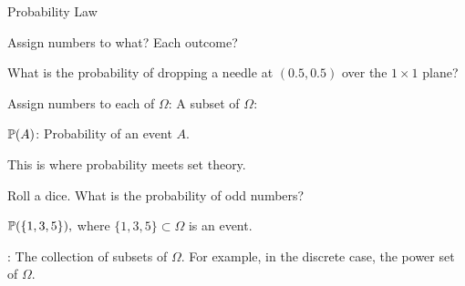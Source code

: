 \documentclass[handout,fleqn,aspectratio=169]{beamer}
\begin{document}
\begin{frame}{Probability Law}

\plitemsep 0.1in

\bci

\item Assign numbers to what? Each outcome?

\item What is the probability of dropping a needle at $(0.5, 0.5)$ over the $1\times 1$ plane? 

\item Assign numbers to each  of $\Omega$: A subset of $\Omega$: 

\item $\mathbb{P}( A )$: Probability of an event $A.$

\bci
\item This is where probability meets set theory.  

\item Roll a dice. What is the probability of odd numbers?

\medskip
$
\mathbb{P}(  \{1,3,5 \} ),
$
where $\{1,3,5 \} \subset \Omega$ is an event.
\eci

\item {}: The collection of subsets of $\Omega.$ 
For example, in the discrete case, the power set of $\Omega.$ 

\item {}
\eci

\end{frame}
\end{document}
